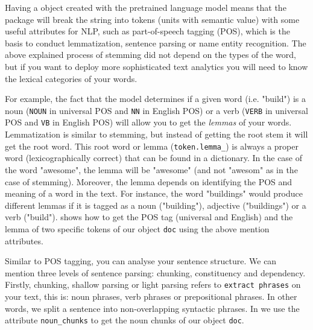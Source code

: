 
Having a  object created with the pretrained language model means that the package will break the string into tokens (units with semantic value) with some useful attributes for NLP, such as part-of-speech tagging (POS), which is the basis to conduct lemmatization, sentence parsing or name entity recognition. The above explained process of stemming did not depend on the types of the word, but if you want to deploy more sophisticated text analytics you will need to know the lexical categories of your words. 




For example, the fact that the model determines if a given word (i.e. "build") is a noun (\texttt{NOUN} in universal POS and \texttt{NN} in English POS) or a verb (\texttt{VERB} in universal POS and \texttt{VB} in English POS) will allow you to get the \textit{lemmas} of your words. Lemmatization is similar to stemming, but instead of getting the root stem it will get the root word. This root word or lemma (\verb|token.lemma_|) is always a proper word (lexicographically correct) that can be found in a dictionary. In the case of the word "awesome", the lemma will be "awesome" (and not "awesom" as in the case of stemming). Moreover, the lemma depends on identifying the POS and meaning of a word in the text. For instance, the word "buildings" would produce different lemmas if it is tagged as a noun ("building"), adjective ("buildings") or a verb ("build").  shows how to get the POS tag (universal and English) and the lemma of two specific tokens of our object \texttt{doc} using the above mention attributes.


Similar to POS tagging, you can analyse your sentence structure. We can mention three levels of sentence parsing: chunking, constituency and dependency. Firstly, chunking, shallow parsing or light parsing refers to \texttt{extract phrases} on your text, this is: noun phrases, verb phrases or prepositional phrases.  In other words, we split a sentence into non-overlapping syntactic phrases. In  we use the attribute \verb|noun_chunks| to get the noun chunks of our  object \texttt{doc}.

